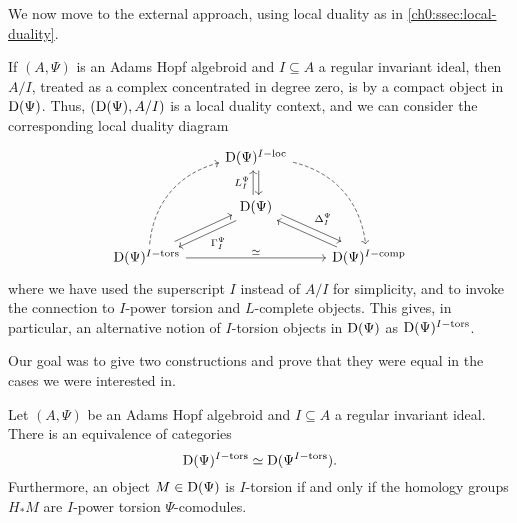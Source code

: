 

We now move to the external approach, using local duality as in \cref{ch0:ssec:local-duality}. 

\begin{construction}
    \label{ch0:const:local-duality-hopf-algebroid}
    If $(A, \Psi)$ is an Adams Hopf algebroid and $I\subseteq A$ a regular invariant ideal, then $A/I$, treated as a complex concentrated in degree zero, is by \cite[5.13]{barthel-heard-valenzuela_2018} a compact object in $\mathrm{D}(\Psi)$. Thus, $(\mathrm{D}(\Psi), A/I)$ is a local duality context, and we can consider the corresponding local duality diagram
    \begin{equation*}
        \begin{tikzcd}
            & {\Der(\Psi)\Iloc} \\
            & {\Der(\Psi)} \\
            {\Der(\Psi)\Itors} && {\Der(\Psi)\Icomp}
            \arrow["L_I^\Psi", xshift=-2pt, from=2-2, to=1-2]
            \arrow[xshift=2pt, from=1-2, to=2-2]
            \arrow["\Delta_I^\Psi", yshift=2pt, xshift=2pt, from=2-2, to=3-3]
            \arrow[yshift=-2pt, xshift=-1pt, from=3-3, to=2-2]
            \arrow["\Gamma^\Psi_I", yshift=-2pt, xshift=2pt, from=2-2, to=3-1]
            \arrow[yshift=2pt, xshift=-1pt, from=3-1, to=2-2]
            \arrow[bend left=35, dashed, from=3-1, to=1-2]
            \arrow[bend left=35, dashed, from=1-2, to=3-3]
            \arrow["\simeq"', swap, from=3-1, to=3-3]
        \end{tikzcd}    
    \end{equation*}
    where we have used the superscript $I$ instead of $A/I$ for simplicity, and to invoke the connection to $I$-power torsion and $L$-complete objects. This gives, in particular, an alternative notion of $I$-torsion objects in $\mathrm{D}(\Psi)$ as $\mathrm{D}(\Psi)^{I-\mathrm{tors}}$. 
\end{construction}

Our goal was to give two constructions and prove that they were equal in the cases we were interested in. 

\begin{lemma}
    \label{ch0:lm:derived-torsion-if-homology-torsion}
    Let $(A,\Psi)$ be an Adams Hopf algebroid and $I\subseteq A$ a regular invariant ideal. There is an equivalence of categories 
    \[\mathrm{D}(\Psi)^{I-\mathrm{tors}}\simeq \mathrm{D}(\Psi^{I-\mathrm{tors}}).\] 
    Furthermore, an object $M\in \mathrm{D}(\Psi)$ is $I$-torsion if and only if the homology groups $H_* M$ are $I$-power torsion $\Psi$-comodules.
\end{lemma}

